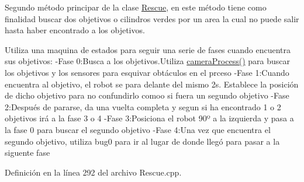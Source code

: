 Segundo método principar de la clase \hyperlink{classRescue}{Rescue}, en este método tiene como finalidad buscar dos objetivos o cilindros verdes por un area la cual no puede salir hasta haber encontrado a los objetivos. 

Utiliza una maquina de estados para seguir una serie de fases cuando encuentra sus objetivos\+: -\/\+Fase 0\+:Busca a los objetivos.\+Utiliza \hyperlink{classRescue_a8fca4fbd58ec9ccab6fc88424b16723f_a8fca4fbd58ec9ccab6fc88424b16723f}{camera\+Process()} para buscar los objetivos y los sensores para esquivar obtáculos en el prceso -\/\+Fase 1\+:Cuando encuentra al objetivo, el robot se para delante del mismo 2s. Establece la posición de dicho objetivo para no confundirlo comoo si fuera un segundo objetivo -\/\+Fase 2\+:Después de pararse, da una vuelta completa y segun si ha encontrado 1 o 2 objetivos irá a la fase 3 o 4 -\/\+Fase 3\+:Posiciona el robot 90º a la izquierda y pasa a la fase 0 para buscar el segundo objetivo -\/\+Fase 4\+:Una vez que encuentra el segundo objetivo, utiliza bug0 para ir al lugar de donde llegó para pasar a la siguente fase 

Definición en la línea 292 del archivo Rescue.\+cpp.


